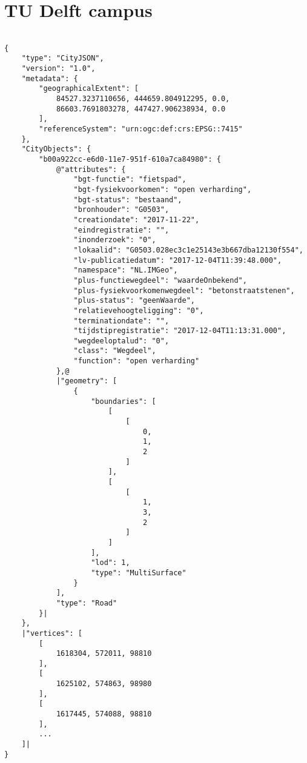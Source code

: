 \section{TU Delft campus}


\begin{scriptsize}
\begin{minipage}[c]{\linewidth / 1}


\begin{lstlisting}[frame=single,style=base,caption={Snippet of TU Delft campus dataset}, label=dataset:tudelft]

{
    "type": "CityJSON",
    "version": "1.0",
    "metadata": {
        "geographicalExtent": [
            84527.3237110656, 444659.804912295, 0.0,
            86603.7691803278, 447427.906238934, 0.0
        ],
        "referenceSystem": "urn:ogc:def:crs:EPSG::7415"
    },
    "CityObjects": {
        "b00a922cc-e6d0-11e7-951f-610a7ca84980": {
            @"attributes": {
                "bgt-functie": "fietspad",
                "bgt-fysiekvoorkomen": "open verharding",
                "bgt-status": "bestaand",
                "bronhouder": "G0503",
                "creationdate": "2017-11-22",
                "eindregistratie": "",
                "inonderzoek": "0",
                "lokaalid": "G0503.028ec3c1e25143e3b667dba12130f554",
                "lv-publicatiedatum": "2017-12-04T11:39:48.000",
                "namespace": "NL.IMGeo",
                "plus-functiewegdeel": "waardeOnbekend",
                "plus-fysiekvoorkomenwegdeel": "betonstraatstenen",
                "plus-status": "geenWaarde",
                "relatievehoogteligging": "0",
                "terminationdate": "",
                "tijdstipregistratie": "2017-12-04T11:13:31.000",
                "wegdeeloptalud": "0",
                "class": "Wegdeel",
                "function": "open verharding"
            },@
            |"geometry": [
                {
                    "boundaries": [
                        [
                            [
                                0,
                                1,
                                2
                            ]
                        ],
                        [
                            [
                                1,
                                3,
                                2
                            ]
                        ]
                    ],
                    "lod": 1,
                    "type": "MultiSurface"
                }
            ],
            "type": "Road"
        }|
    },
    |"vertices": [
        [
            1618304, 572011, 98810
        ],
        [
            1625102, 574863, 98980
        ],
        [
            1617445, 574088, 98810
        ],
        ...
    ]|
}

\end{lstlisting}


\end{minipage}
\end{scriptsize}



